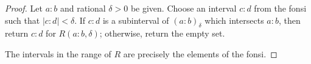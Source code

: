 \documentclass[12pt]{article}
\begin{document}
\begin{proof}
    Let $a:b$ and rational $\delta>0$ be given. Choose an interval $c:d$ from the fonsi such that $|c:d| < \delta$. If $c:d$ is a subinterval of $(a:b)_{\delta}$ which intersects $a:b$, then return $c:d$ for $R(a:b, \delta)$; otherwise, return the empty set. 

    The intervals in the range of $R$ are precisely the elements of the fonsi. 
    
     


\end{proof}
\end{document}
